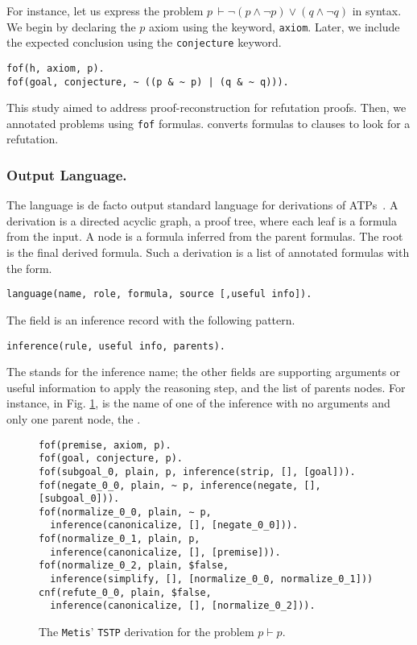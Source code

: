 \documentclass[../main.tex]{subfiles}
\begin{document}
For instance, let us express the problem
$p\, \vdash \neg (p \wedge \neg p) ∨ (q \wedge \neg q)$
in \TPTP syntax. We begin by declaring the $p$ axiom using the keyword,
\verb!axiom!. Later, we include the expected conclusion using the \verb!conjecture! keyword.

\begin{verbatim}
fof(h, axiom, p).
fof(goal, conjecture, ~ ((p & ~ p) | (q & ~ q))).
\end{verbatim}

This study aimed to address proof-reconstruction for refutation
proofs. Then, we annotated  problems using \verb!fof! formulas.
\Metis converts  formulas to  clauses to look for a
refutation.

\subsubsection{Output Language.}
\label{ssec:output-language}

The \TSTP language is de facto output standard language
for derivations of ATPs~\cite{Sutcliffe-Schulz-Claessen-VanGelder-2006}.
A \TSTP derivation is a directed acyclic graph, a proof tree,
where each leaf is a formula from the \TPTP input. A node is a formula
inferred from the parent formulas. The root is the final derived formula.
Such a derivation is a list of annotated formulas with the form.

\begin{verbatim}
language(name, role, formula, source [,useful info]).
\end{verbatim}

The  field is an inference record with the following
pattern.

\begin{verbatim}
inference(rule, useful info, parents).
\end{verbatim}

The  stands for the inference name; the other fields are
supporting arguments or useful information to apply the reasoning
step, and the list of parents nodes. For instance, in Fig.
\ref{fig:metis-proof-tstp}, \strip is the name of one of the
inference with no arguments and only one parent node, the
.

\begin{figure}
\begin{verbatim}
fof(premise, axiom, p).
fof(goal, conjecture, p).
fof(subgoal_0, plain, p, inference(strip, [], [goal])).
fof(negate_0_0, plain, ~ p, inference(negate, [], [subgoal_0])).
fof(normalize_0_0, plain, ∼ p,
  inference(canonicalize, [], [negate_0_0])).
fof(normalize_0_1, plain, p,
  inference(canonicalize, [], [premise])).
fof(normalize_0_2, plain, $false,
  inference(simplify, [], [normalize_0_0, normalize_0_1]))
cnf(refute_0_0, plain, $false,
  inference(canonicalize, [], [normalize_0_2])).
\end{verbatim}
\caption{The \texttt{Metis}' \texttt{TSTP} derivation for the
problem $p\vdash p$.}
\label{fig:metis-proof-tstp}
\end{figure}
\end{document}
